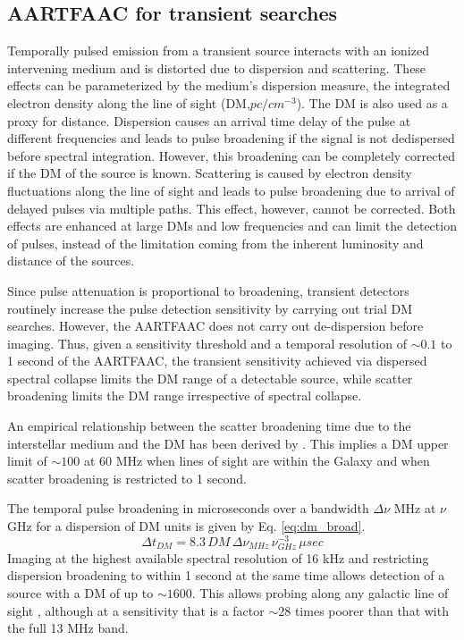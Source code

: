 \documentclass[referee]{aa}
\begin{document}
\subsection{\label{sub:AARTFAAC-for-Transient}AARTFAAC for transient searches}

Temporally pulsed  emission from  a transient source  interacts with  an ionized
intervening medium  and is  distorted due to  dispersion and  scattering. These
effects can be parameterized by  the medium's dispersion measure, the integrated
electron density along the line of  sight (DM,$pc/cm^{-3}$). The DM is also used
as a proxy for distance. Dispersion causes an arrival time delay of the pulse at
different  frequencies and  leads  to pulse  broadening  if the  signal is  not
dedispersed  before  spectral  integration.  However,  this  broadening  can  be
completely corrected if  the DM of the source is known.  Scattering is caused by
electron  density  fluctuations along  the  line of  sight  and leads to  pulse
broadening due  to arrival  of delayed pulses  via multiple paths.  This effect,
however, cannot  be corrected. Both  effects are enhanced  at large DMs  and low
frequencies and  can limit the detection  of pulses, instead  of the limitation
coming from the inherent luminosity and distance of the sources.

Since  pulse  attenuation is  proportional  to  broadening, transient  detectors
routinely  increase the  pulse detection  sensitivity by  carrying out  trial DM
searches.   However,  the  AARTFAAC  does  not carry  out  de-dispersion  before
imaging.   Thus, given  a sensitivity  threshold  and a  temporal resolution  of
$\sim$$0.1$ to  1 second of the  AARTFAAC, the transient  sensitivity achieved via
dispersed spectral  collapse limits the DM  range of a  detectable source, while
scatter broadening limits the DM range irrespective of spectral collapse.

An  empirical  relationship between  the  scatter  broadening  time due  to  the
interstellar     medium     and    the     DM     has     been    derived     by
\citet{bhat2004multifrequency}. This implies a DM upper limit of $\sim$$100$ at 60
MHz when  lines of sight  are within the  Galaxy and when scatter  broadening is
restricted to 1 second.

The temporal pulse  broadening in microseconds over a  bandwidth $\Delta\nu$ MHz
at $\nu$ GHz for a dispersion of DM units is given by Eq. \ref{eq:dm_broad}.
\begin{equation}
\Delta t_{DM}=8.3\,DM\,\Delta\nu_{MHz}\,\nu_{GHz}^{-3}\, \mu sec\label{eq:dm_broad}
\end{equation}
Imaging at the  highest available spectral resolution of  16 kHz and restricting
dispersion broadening to within 1 second  at the same time allows detection of a
source with  a DM of up to  $\sim$$1600$.  This allows probing  along any galactic
line of sight \citep{cordes2002ne2001}, although  at a sensitivity that is a factor  $\sim$$28$ times poorer than that with the full 13 MHz band.
\end{document}
